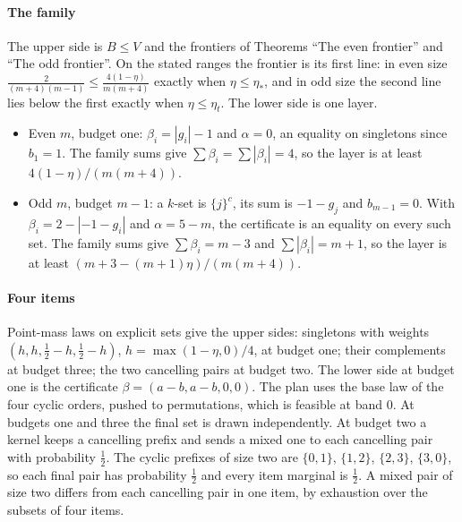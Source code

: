 \paragraph{The family} The upper side is $B\le V$ and the frontiers of Theorems ``The even
frontier'' and ``The odd frontier''. On the stated ranges the frontier is its first line: in even
size $\frac{2}{(m+4)(m-1)}\le\frac{4(1-\eta)}{m(m+4)}$ exactly when $\eta\le\eta_*$, and in odd size
the second line lies below the first exactly when $\eta\le\eta_t$. The lower side is one layer.
\begin{itemize}
\item Even $m$, budget one: $\beta_i=|g_i|-1$ and $\alpha=0$, an equality on singletons since
$b_1=1$. The family sums give $\sum\beta_i=\sum|\beta_i|=4$, so the layer is at least
$4(1-\eta)/(m(m+4))$.
\item Odd $m$, budget $m-1$: a $k$-set is $\{j\}^{c}$, its sum is $-1-g_j$ and $b_{m-1}=0$. With
$\beta_i=2-|-1-g_i|$ and $\alpha=5-m$, the certificate is an equality on every such set. The family
sums give $\sum\beta_i=m-3$ and $\sum|\beta_i|=m+1$, so the layer is at least
$(m+3-(m+1)\eta)/(m(m+4))$.
\end{itemize}

\paragraph{Four items} Point-mass laws on explicit sets give the upper sides: singletons with
weights $(h,h,\frac12-h,\frac12-h)$, $h=\max(1-\eta,0)/4$, at budget one; their complements at
budget three; the two cancelling pairs at budget two. The lower side at budget one is the
certificate $\beta=(a-b,a-b,0,0)$. The plan uses the base law of the four cyclic orders, pushed
to permutations, which is feasible at band $0$. At budgets one and three the final set is drawn
independently. At budget two a kernel keeps a cancelling prefix and sends a mixed one to each
cancelling pair with probability $\frac12$. The cyclic prefixes of size two are $\{0,1\}$,
$\{1,2\}$, $\{2,3\}$, $\{3,0\}$, so each final pair has probability $\frac12$ and every item
marginal is $\frac12$. A mixed pair of size two differs from each cancelling pair in one item, by
exhaustion over the subsets of four items.

